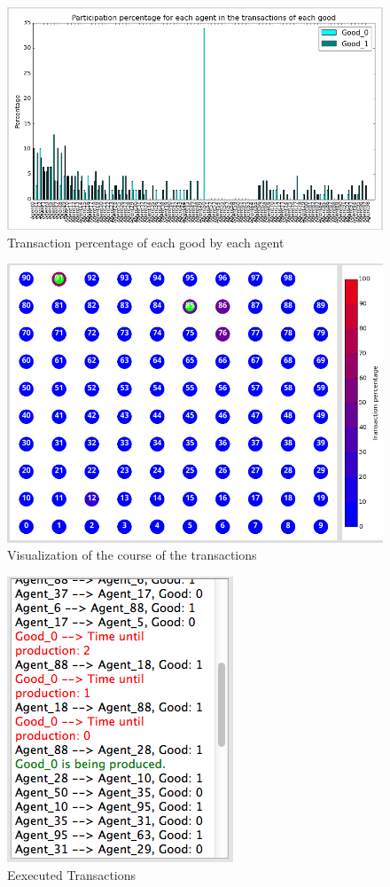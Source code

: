 \documentclass[twoside,openright]{uva-bachelor-thesis}
\begin{document}
\begin{figure}[h]
  \centering
  \includegraphics[scale=0.4]{Simulation2_figures/Distribution}
  \caption{Transaction percentage of each good by each agent}
\end{figure}
\clearpage
\begin{figure}
  \centering
  \includegraphics[scale=0.4]{Simulation2_figures/Visualization}
  \caption{Visualization of the course of the transactions}
\end{figure}

\begin{figure}
  \centering
  \includegraphics[scale=0.4]{Simulation2_figures/Transactions}
  \caption{Eexecuted Transactions}
\end{figure}
\end{document}
